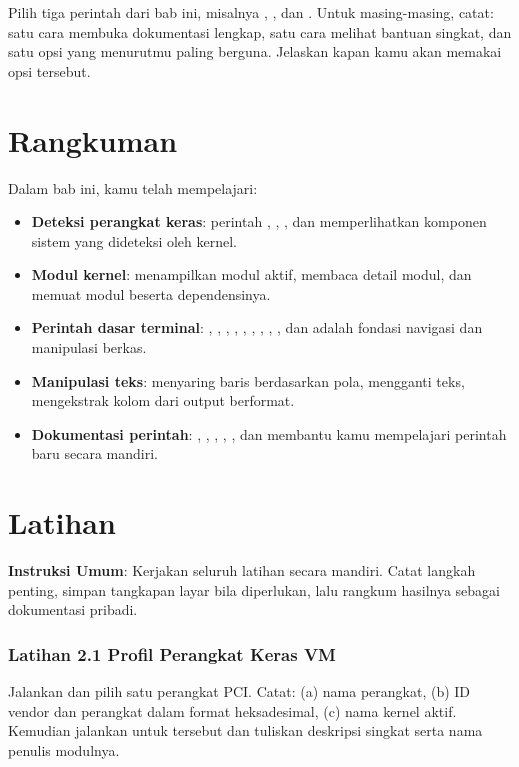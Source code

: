 \begin{challengebox}
Pilih tiga perintah dari bab ini, misalnya , , dan . Untuk masing-masing, catat: satu cara membuka dokumentasi lengkap, satu cara melihat bantuan singkat, dan satu opsi yang menurutmu paling berguna. Jelaskan kapan kamu akan memakai opsi tersebut.
\end{challengebox}

\section{Rangkuman}

Dalam bab ini, kamu telah mempelajari:

\begin{itemize}[noitemsep,topsep=2pt]
    \item \textbf{Deteksi perangkat keras}: perintah , , , dan  memperlihatkan komponen sistem yang dideteksi oleh kernel.
    \item \textbf{Modul kernel}:  menampilkan modul aktif,  membaca detail modul, dan  memuat modul beserta dependensinya.
    \item \textbf{Perintah dasar terminal}: , , , , , , , , , dan  adalah fondasi navigasi dan manipulasi berkas.
    \item \textbf{Manipulasi teks}:  menyaring baris berdasarkan pola,  mengganti teks,  mengekstrak kolom dari output berformat.
    \item \textbf{Dokumentasi perintah}: , , , , , dan  membantu kamu mempelajari perintah baru secara mandiri.
\end{itemize}

\section{Latihan}

\textbf{Instruksi Umum}: Kerjakan seluruh latihan secara mandiri. Catat langkah penting, simpan tangkapan layar bila diperlukan, lalu rangkum hasilnya sebagai dokumentasi pribadi.

\subsubsection*{Latihan 2.1 Profil Perangkat Keras VM}
Jalankan  dan pilih satu perangkat PCI. Catat: (a) nama perangkat, (b) ID vendor dan perangkat dalam format heksadesimal, (c) nama  kernel aktif. Kemudian jalankan  untuk  tersebut dan tuliskan deskripsi singkat serta nama penulis modulnya.


